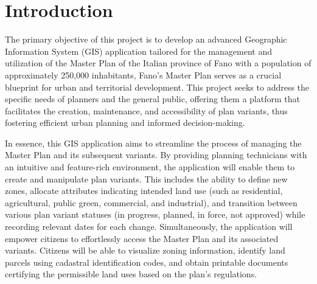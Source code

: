 
\chapter{Introduction}
\label{ch:introduction}
The primary objective of this project is to develop an advanced Geographic Information System (GIS) application tailored for the management and utilization of the Master Plan of the Italian province of Fano with a population of approximately 250,000 inhabitants, Fano's Master Plan serves as a crucial blueprint for urban and territorial development.
This project seeks to address the specific needs of planners and the general public, offering them a platform that facilitates the creation, maintenance, and accessibility of plan variants, thus fostering efficient urban planning and informed decision-making.

In essence, this GIS application aims to streamline the process of managing the Master Plan and its subsequent variants.
By providing planning technicians with an intuitive and feature-rich environment, the application will enable them to create and manipulate plan variants.
This includes the ability to define new zones, allocate attributes indicating intended land use (such as residential, agricultural, public green, commercial, and industrial), and transition between various plan variant statuses (in progress, planned, in force, not approved) while recording relevant dates for each change.
Simultaneously, the application will empower citizens to effortlessly access the Master Plan and its associated variants.
Citizens will be able to visualize zoning information, identify land parcels using cadastral identification codes, and obtain printable documents certifying the permissible land uses based on the plan's regulations.
